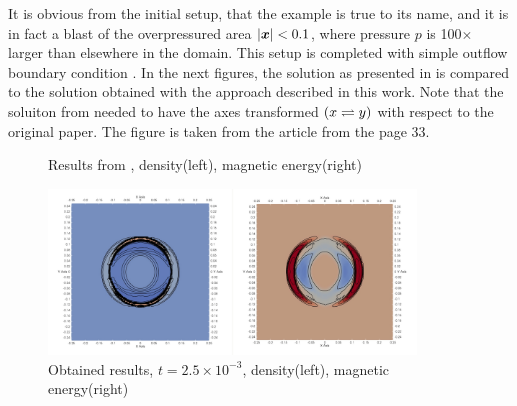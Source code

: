 It is obvious from the initial setup, that the example is true to its name, and it is in fact a blast of the overpressured area $\left|\mbox{\boldmath $x$}\right| < 0.1$, where pressure $p$ is 100$\times$ larger than elsewhere in the domain. This setup is completed with simple outflow boundary condition .
In the next figures, the solution as presented in \cite{blast1} is compared to the solution obtained with the approach described in this work. Note that the soluiton from \cite{blast1} needed to have the axes transformed $\left( x\rightleftharpoons y\right)$ with respect to the original paper. The figure  is taken from the article \cite{blast1} from the page 33.

\begin{figure}[H]
\centering
{}
\caption{Results from \cite{blast1}, density(left), magnetic energy(right)}
\label{figure:blastOldRef}
\end{figure}

\vspace{-5mm}
\begin{figure}[H]
	\begin{center}
		\includegraphics[width=0.87\textwidth]{img//mhd-blast/old/my0.jpg}
	\caption{Obtained results, $t = 2.5\times 10^{-3}$, density(left), magnetic energy(right)}
	\label{figure:blastOldMy1}
	\end{center}
\end{figure}
\vspace{-5mm}

